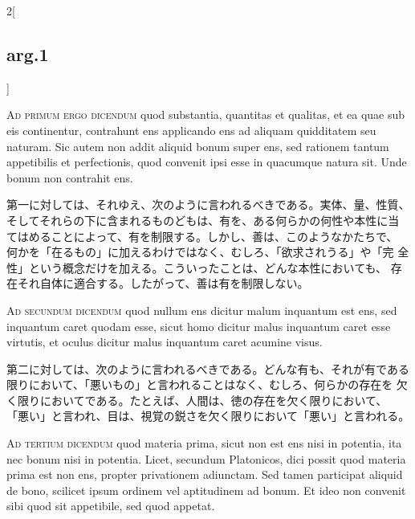 \documentclass[paper=a4paper,fontsize=10pt,jafontsize=9pt,titlepage]{jlreq}
\begin{document}
\begin{paracol}{2}[\subsection{arg.1}]
\switchcolumn*[\subsection{ad.1}]

{\scshape Ad primum ergo dicendum} quod substantia, quantitas et qualitas, et
 ea quae sub eis continentur, contrahunt ens applicando ens ad aliquam
 quidditatem seu naturam. Sic autem non addit aliquid bonum super ens,
 sed rationem tantum appetibilis et perfectionis, quod convenit ipsi
 esse in quacumque natura sit. Unde bonum non contrahit ens.

\switchcolumn

第一に対しては、それゆえ、次のように言われるべきである。実体、量、性質、
 そしてそれらの下に含まれるものどもは、有を、ある何らかの何性や本性に当
 てはめることによって、有を制限する。しかし、善は、このようなかたちで、
 何かを「在るもの」に加えるわけではなく、むしろ、「欲求されうる」や「完
 全性」という概念だけを加える。こういったことは、どんな本性においても、
 存在それ自体に適合する。したがって、善は有を制限しない。

\switchcolumn*[\subsection{ad.2}]

{\scshape Ad secundum dicendum} quod nullum ens dicitur malum inquantum est
 ens, sed inquantum caret quodam esse, sicut homo dicitur malus
 inquantum caret esse virtutis, et oculus dicitur malus inquantum caret
 acumine visus.

\switchcolumn

第二に対しては、次のように言われるべきである。どんな有も、それが有である
 限りにおいて、「悪いもの」と言われることはなく、むしろ、何らかの存在を
 欠く限りにおいてである。たとえば、人間は、徳の存在を欠く限りにおいて、
 「悪い」と言われ、目は、視覚の鋭さを欠く限りにおいて「悪い」と言われる。

\switchcolumn*[\subsection{ad.3}]

{\scshape Ad tertium dicendum} quod materia prima, sicut non est ens nisi in
 potentia, ita nec bonum nisi in potentia. Licet, secundum Platonicos,
 dici possit quod materia prima est non ens, propter privationem
 adiunctam. Sed tamen participat aliquid de bono, scilicet ipsum ordinem
 vel aptitudinem ad bonum. Et ideo non convenit sibi quod sit
 appetibile, sed quod appetat.


\end{paracol}
\end{document}
